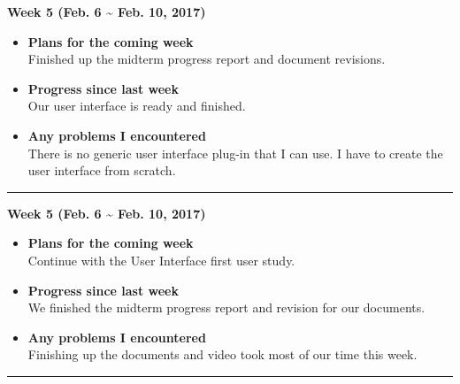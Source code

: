 	\begin{center}
		\textbf{Week 5 (Feb. 6 {\textasciitilde{}} Feb. 10, 2017)}
	\end{center}
	\begin{itemize}
		\item \textbf{Plans for the coming week}
		\\Finished up the midterm progress report and document revisions. \\

		\item \textbf{Progress since last week}
		\\Our user interface is ready and finished. \\

		\item \textbf{Any problems I encountered}
		\\There is no generic user interface plug-in that I can use. I have to create the user interface from scratch.\\
	\end{itemize}

	\rule{\textwidth}{0.5pt}

	\begin{center}
		\textbf{Week 5 (Feb. 6 {\textasciitilde{}} Feb. 10, 2017)}
	\end{center}
	\begin{itemize}
		\item \textbf{Plans for the coming week}
		\\Continue with the User Interface first user study. \\

		\item \textbf{Progress since last week}
		\\We finished the midterm progress report and revision for our documents. \\

		\item \textbf{Any problems I encountered}
		\\Finishing up the documents and video took most of our time this week.\\
	\end{itemize}

	\rule{\textwidth}{0.5pt}

